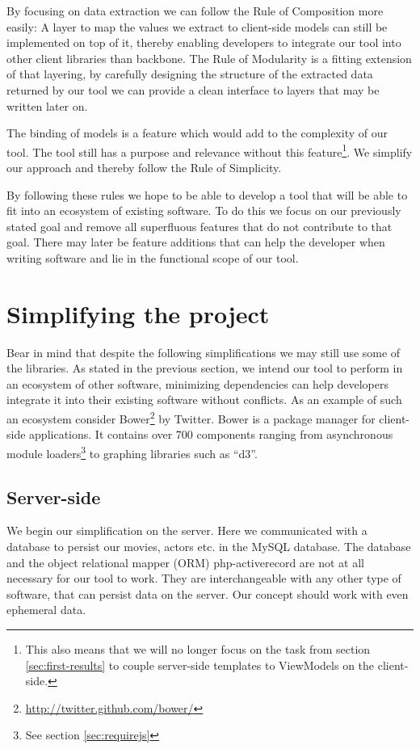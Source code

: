 \documentclass[thesis.tex]{subfiles}
\begin{document}
By focusing on data extraction we can follow the Rule of Composition more
easily: A layer to map the values we extract to client-side models can still be
implemented on top of it, thereby enabling developers to integrate our tool into
other client libraries than backbone.
The Rule of Modularity is a fitting extension of that layering, by carefully
designing the structure of the extracted data returned by our tool we can
provide a clean interface to layers that may be written later on.

The binding of models is a feature which would add to the complexity of our
tool. The tool still has a purpose and relevance without this feature\footnote{
	This also means that we will no longer focus on the task from
	section \ref{sec:first-results} to couple server-side templates to ViewModels
	on the client-side.
}.
We simplify our approach and thereby follow the Rule of Simplicity.

By following these rules we hope to be able to develop a tool that will be able
to fit into an ecosystem of existing software. To do this we focus on our
previously stated goal and remove all superfluous features that do not
contribute to that goal. There may later be feature additions that can help the
developer when writing software and lie in the functional scope of our tool.

\section{Simplifying the project}
\label{sec:simplifying}
Bear in mind that despite the following simplifications we may still use some
of the libraries.
As stated in the previous section, we intend our tool to perform in an ecosystem
of other software, minimizing dependencies can help developers integrate it into
their existing software without conflicts. As an example of such an ecosystem
consider Bower\footnote{\url{http://twitter.github.com/bower/}} by Twitter.
Bower is a package manager for client-side applications. It contains over 700
components ranging from asynchronous module
loaders\footnote{See section \ref{sec:requirejs}} to graphing libraries such
as ``d3''.

\subsection{Server-side}
We begin our simplification on the server. Here we communicated with a database
to persist our movies, actors etc. in the MySQL database. The database and the
object relational mapper (ORM) php-activerecord are not at all necessary for our
tool to work. They are interchangeable with any other type of software, that can
persist data on the server. Our concept should work with even ephemeral data.
\end{document}
